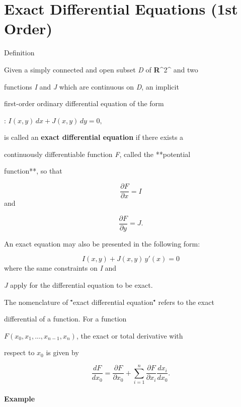 \section{Exact Differential Equations (1st Order)}
\label{sec:exact-differential-equations-1st-order}

Definition



Given a simply connected and open subset \textit{D} of \textbf{R}^2^ and two

functions \textit{I} and \textit{J} which are continuous on \textit{D}, an implicit

first-order ordinary differential equation of the form



:   $I(x, y)\, dx + J(x, y)\, dy = 0,$



is called an \textbf{exact differential equation} if there exists a

continuously differentiable function \textit{F}, called the **potential

function**, so that



$$\frac{\partial F}{\partial x} = I$$ and



$$\frac{\partial F}{\partial y} = J.$$



An exact equation may also be presented in the following form:



$$I(x, y) + J(x, y) \, y'(x) = 0$$ where the same constraints on \textit{I} and

\textit{J} apply for the differential equation to be exact.



The nomenclature of \""exact differential equation\"" refers to the exact

differential of a function. For a function

$F(x_0, x_1,...,x_{n-1},x_n)$, the exact or total derivative with

respect to $x_0$ is given by



$$\frac{dF}{dx_0}=\frac{\partial F}{\partial x_0}+\sum_{i=1}^{n}\frac{\partial F}{\partial x_i}\frac{dx_i}{dx_0}.$$



\paragraph{Example}



